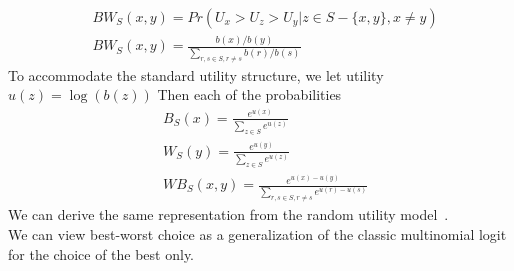 \documentclass[nonblindrev]{informs3}
\begin{document}
\begin{align*}
&BW_S(x,y)=Pr(U_x>U_z>U_y | z \in S -\{x,y\}, x\neq y)\\
&BW_S(x,y)=\frac{b(x)/b(y)}{\sum_{r,s \in S, r \neq s}b(r)/b(s)}
\end{align*}
To accommodate the standard utility structure, we let utility $u(z)=\log{(b(z))}$ Then each of the probabilities 
\begin{align*}
&B_S(x)=\frac{e^{u(x)}}{\sum_{z \in S} e^{u(z)}}\\
&W_S(y)=\frac{e^{u(y)}}{\sum_{z \in S} e^{u(z)}}\\
&WB_S(x,y)=\frac{e^{u(x)-u(y)}}{\sum_{r,s \in S, r\neq s} e^{u(r)-u(s)}}
\end{align*}
We can derive the same representation from the random utility model~\cite{marley2005some}. \\
We can view best-worst choice as a generalization of the classic multinomial logit for the choice of the best only.\\
\end{document}
